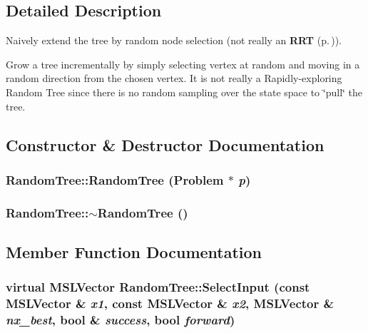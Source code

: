 \subsection{Detailed Description}
Naively extend the tree by random node selection (not really an {\bf RRT} {\rm (p.\,\pageref{class_RRT})}).

Grow a tree incrementally by simply selecting vertex at random and  moving in a random direction from the chosen vertex. It is not  really a Rapidly-exploring Random Tree since there is no random sampling over the state space to \char`\"{}pull\char`\"{} the tree. 



\subsection{Constructor \& Destructor Documentation}
\subsubsection{\setlength{\rightskip}{0pt plus 5cm}Random\-Tree::Random\-Tree ({\bf Problem} $\ast$ {\em p})}\label{class_RandomTree_a0}


\subsubsection{\setlength{\rightskip}{0pt plus 5cm}Random\-Tree::$\sim$Random\-Tree ()\hspace{0.3cm}{\tt  [inline, virtual]}}\label{class_RandomTree_a1}




\subsection{Member Function Documentation}
\subsubsection{\setlength{\rightskip}{0pt plus 5cm}virtual {\bf MSLVector} Random\-Tree::Select\-Input (const {\bf MSLVector} \& {\em x1}, const {\bf MSLVector} \& {\em x2}, {\bf MSLVector} \& {\em nx\_\-best}, bool \& {\em success}, bool {\em forward})\hspace{0.3cm}{\tt  [protected, virtual]}}\label{class_RandomTree_b1}


